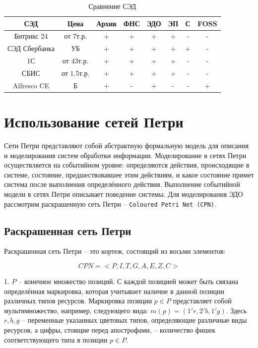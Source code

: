 \begin{table}[h!]
	\begin{center}
		\caption{Сравнение СЭД}
		\label{tab:dbs}
		\begin{tabular}{|c|c|c|c|c|c|c|c|}
			\hline
			СЭД & Цена & Архив & ФНС & ЭДО & ЭП & С & FOSS\\
			\hline
			Битрикс 24 & от 7т.р. & + & + & + & + & - & - \\ \hline
			СЭД Сбербанка & УБ & + & + & + & + & + & -\\ \hline
			1С & от 43т.р. & +  & + & + & + & - & -\\ \hline
			СБИС & от 1.5т.р. & + & + & + & + & - & -\\ \hline
			Alfresco CE & Б & + & - & + & - & - & +\\ \hline
		\end{tabular}
	\end{center}
\end{table}

\clearpage

\section{Использование сетей Петри}

Сети Петри\cite{kotov-petri} представляют собой абстрактную формальную модель для описания и моделирования систем обработки информации. Моделирование в сетях Петри осуществляется на событийном уровне: определяются действия, происходящие в системе, состояние, предшествовавшее этим действиям, и какое состояние примет система после выполнения определённого действия. Выполнение событийной модели в сетях Петри описывает поведение системы. Для моделирования ЭДО рассмотрим раскрашенную сеть Петри\cite{kotov-petri} -- \texttt{Coloured Petri Net (CPN)}. 

\subsection{Раскрашенная сеть Петри}

Раскрашенная сеть Петри -- это кортеж, состоящий из восьми элементов:

\begin{equation}
	CPN = <P, I, T, G, A, E, Z, C>
\end{equation}

1. $P$ -- конечное множество позиций. С каждой позицией может
быть связана определённая маркировка, которая учитывает наличие
в данной позиции различных типов ресурсов. Маркировка позиции
$p \in P$ представляет собой мультимножество, например, следующего
вида: $m(p) = (1'r,2'b,1'g)$. Здесь $r, b, g$ -- переменные указанных цветовых типов, определяющие различные виды ресурсов, а цифры, стоящие перед апострофами, -- количество фишек соответствующего типа
в позиции $p \in P$.


